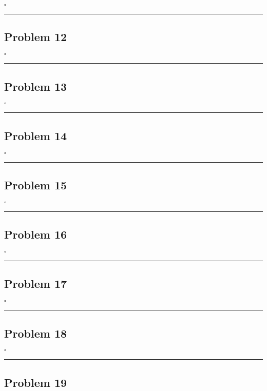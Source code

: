 \documentclass[12pt]{article}
\newcommand*{\QEDB}{\hfill\ensuremath{\square}}
\newcommand{\horrule}[1]{\rule{\linewidth}{#1}}
\begin{document}
\QEDB

\horrule{0.5pt}

\subsection*{Problem 12}



\QEDB

\horrule{0.5pt}

\subsection*{Problem 13}

\QEDB

\horrule{0.5pt}

\subsection*{Problem 14}

\QEDB

\horrule{0.5pt}

\subsection*{Problem 15}

\QEDB

\horrule{0.5pt}

\subsection*{Problem 16}

\QEDB

\horrule{0.5pt}

\subsection*{Problem 17}

\QEDB

\horrule{0.5pt}

\subsection*{Problem 18}

\QEDB

\horrule{0.5pt}

\subsection*{Problem 19}
\end{document}
